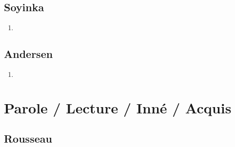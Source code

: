 \documentclass[a4paper, 11pt, hidelinks]{article}
\begin{document}
\subsection{Soyinka}


\begin{enumerate}
    \item 
\end{enumerate}




\subsection{Andersen}


\begin{enumerate}
    \item 
\end{enumerate}













































\section{Parole / Lecture / Inné / Acquis}



\subsection{Rousseau}
\end{document}
